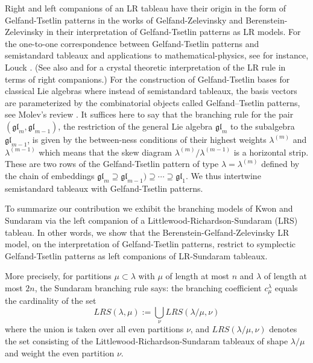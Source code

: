 \documentclass[reqno]{amsart}
\theoremstyle{tplain}
\begin{document}
 Right and left companions of an LR tableau    have  their origin in  the form of Gelfand-Tsetlin patterns \cite{gt50} in the works of Gelfand-Zelevinsky \cite{GZ85, gzpolyed} and Berenstein-Zelevinsky \cite{BZphy} in their interpretation of Gelfand-Tsetlin patterns as  LR models.  For the one-to-one correspondence between Gelfand-Tsetlin patterns and semistandard tableaux and applications to mathematical-physics, see for instance, Louck \cite{Louck}. (See also
 \cite{dookim,  akt16} and \cite[Appendix]{Nak05} for a crystal theoretic interpretation of the LR rule in terms of right companions.)  For the construction of  Gelfand-Tsetlin bases  for classical Lie algebras where instead of
semistandard tableaux, the basis vectors are parameterized by the combinatorial objects
called  Gelfand–Tsetlin patterns, see Molev's review  \cite{molev06}. It suffices here to say that the branching rule for the pair $(\mathfrak{gl}_m,\mathfrak{gl}_{m-1})$, the restriction of the general Lie algebra $\mathfrak{gl}_m$ to the subalgebra $\mathfrak{gl}_{m-1}$, is given by the between-ness conditions of their highest weights $\lambda^{(m)}$ and $\lambda^{(m-1)}$ which means that the skew diagram $\lambda^{(m)}/\lambda^{(m-1)}$ is a horizontal strip. These are  two rows of the Gelfand-Tsetlin pattern of type $\lambda=\lambda^{(m)}$ defined by the chain of embeddings $\mathfrak{gl}_m\supseteq\mathfrak{gl}_{m-1})\supseteq\cdots \supseteq\mathfrak{gl}_{1}$. We thus intertwine  semistandard tableaux with Gelfand-Tsetlin patterns.

To summarize our contribution we exhibit the branching models of Kwon and Sundaram via the left companion of a Littlewood-Richardson-Sundaram (LRS) tableau. In other words, we show that the Berenstein-Gelfand-Zelevinsky LR model, on the interpretation of Gelfand-Tsetlin patterns, restrict to symplectic Gelfand-Tsetlin patterns as left companions of LR-Sundaram tableaux.

More precisely, for partitions $\mu\subset \lambda$ with $\mu$ of length at most $n$ and $\lambda$ of length at most $2n$, the Sundaram branching rule says:
the branching coefficient $c_\mu^\lambda$
equals the cardinality
of the set
$$
LRS(\lambda,\mu):=\bigcup_\nu
LRS(\lambda/\mu,\nu)$$
where the union is taken over all even partitions $\nu$, and $LRS(\lambda/\mu,\nu)$ denotes the set consisting of the Littlewood-Richardson-Sundaram tableaux of shape $\lambda/\mu$ and weight the even partition $\nu$.
\end{document}
